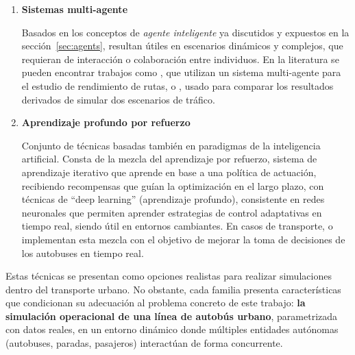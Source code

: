 \begin{enumerate}
    Este tipo de técnicas basadas en paradigmas de inteligencia artificial de inspiración biológica, 
    se centran en la realización de 
    procesos iterativos que aplican operadores de selección, recombinación y perturbación de las soluciones
    inspirados en fenómenos naturales, utilizando funciones de coste (heurísticas) para converger hacia soluciones
    cercanas al óptimo. Resultan muy útiles en aquellos problemas donde la combinatoria de posibles resultados
    válidos tiende a ser computacionalmente compleja. Casos como \textcite{Owais2018Hierarchical} o 
    \textcite{Jha2019MultiObjective} estudian el diseño de redes de tránsito de transporte basados en estas técnicas.
    \item \textbf{Sistemas multi-agente}

    Basados en los conceptos de \textit{agente inteligente} ya discutidos y expuestos en la sección~\ref{sec:agents},
    resultan útiles en escenarios dinámicos y complejos, que requieran de interacción o colaboración entre
    individuos. En la literatura se pueden encontrar trabajos como
    \textcite{saval2023gama}, que utilizan un sistema multi-agente para el estudio de
    rendimiento de rutas, o \textcite{Shaharuddin2021Traffic}, usado para comparar los resultados derivados de
    simular dos escenarios de tráfico.
    \item \textbf{Aprendizaje profundo por refuerzo}
    
    Conjunto de técnicas basadas también en paradigmas de la inteligencia artificial. Consta de la mezcla del 
    aprendizaje por refuerzo, sistema de aprendizaje iterativo que aprende en base a una política de actuación,
    recibiendo recompensas que guían la optimización en el largo plazo, con técnicas de \enquote{deep learning}
    (aprendizaje profundo), consistente en redes neuronales que permiten aprender estrategias de control adaptativas
    en tiempo real, siendo útil en entornos cambiantes. En casos de transporte, \textcite{Bajada2024DeepRL}
    o \textcite{Tang2024Robust} implementan esta mezcla con el objetivo de mejorar la toma de decisiones de los
    autobuses en tiempo real.
\end{enumerate}

Estas técnicas se presentan como opciones realistas para realizar simulaciones dentro del transporte
urbano. No obstante, cada familia presenta características 
que condicionan su adecuación al problema concreto de este trabajo: \textbf{la simulación 
operacional de una línea de autobús urbano}, parametrizada con datos reales, en un 
entorno dinámico donde múltiples entidades autónomas (autobuses, paradas, pasajeros) 
interactúan de forma concurrente.

